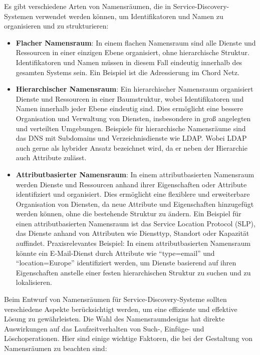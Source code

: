 \documentclass[../vs-script-first-v01.tex]{subfiles}
\begin{document}
Es gibt verschiedene Arten von Namensräumen, die in Service-Discovery-Systemen verwendet werden können, um Identifikatoren und Namen zu organisieren und zu strukturieren:
\begin{itemize}
\item \textbf{Flacher Namensraum}: In einem flachen Namensraum sind alle Dienste und Ressourcen in einer einzigen Ebene organisiert, ohne hierarchische Struktur. Identifikatoren und Namen müssen in diesem Fall eindeutig innerhalb des gesamten Systems sein. Ein Beispiel ist die Adressierung im Chord Netz. 
\item \textbf{Hierarchischer Namensraum}: Ein hierarchischer Namensraum organisiert Dienste und Ressourcen in einer Baumstruktur, wobei Identifikatoren und Namen innerhalb jeder Ebene eindeutig sind. Dies ermöglicht eine bessere Organisation und Verwaltung von Diensten, insbesondere in groß angelegten und verteilten Umgebungen. Beispiele für hierarchische Namensräume sind das DNS mit Subdomains und Verzeichnisdienste wie LDAP. Wobei LDAP auch gerne als hybrider Ansatz bezeichnet wird, da er neben der Hierarchie  auch Attribute zulässt. 
\item \textbf{Attributbasierter Namensraum}: In einem attributbasierten Namensraum werden Dienste und Ressourcen anhand ihrer Eigenschaften oder Attribute identifiziert und organisiert. Dies ermöglicht eine flexiblere und erweiterbare Organisation von Diensten, da neue Attribute und Eigenschaften hinzugefügt werden können, ohne die bestehende Struktur zu ändern. Ein Beispiel für einen attributbasierten Namensraum ist das Service Location Protocol (SLP), das Dienste anhand von Attributen wie Diensttyp, Standort oder Kapazität auffindet. Praxisrelevantes Beispiel: In einem attributbasierten Namensraum könnte ein E-Mail-Dienst durch Attribute wie \enquote{type=email} und \enquote{location=Europe} identifiziert werden, um Dienste basierend auf ihren Eigenschaften anstelle einer festen hierarchischen Struktur zu suchen und zu lokalisieren.
\end{itemize}
Beim Entwurf von Namensräumen für Service-Discovery-Systeme sollten verschiedene Aspekte berücksichtigt werden, um eine effiziente und effektive Lösung zu gewährleisten. Die Wahl des Namensraumdesigns hat direkte Auswirkungen auf das Laufzeitverhalten von Such-, Einfüge- und Löschoperationen. Hier sind einige wichtige Faktoren, die bei der Gestaltung von Namensräumen zu beachten sind:
\end{document}
